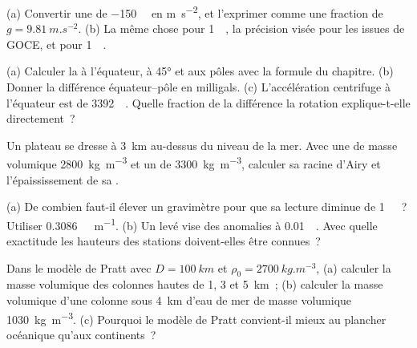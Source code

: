 \begin{exercise}[$\star$]\label{exo:b1:isostasy-gravity:1}
(a) Convertir une  de \qty{-150}{\milli\gal} en \unit{m.s^{-2}},
et l'exprimer comme une fraction de $g = \qty{9.81}{m.s^{-2}}$. (b) La même chose pour
\qty{1}{\milli\gal}, la précision visée pour les  issues de
GOCE, et pour \qty{1}{\micro\gal}.
\end{exercise}

\begin{exercise}[$\star$]\label{exo:b1:isostasy-gravity:2}
(a) Calculer la  à l'équateur, à \ang{45} et aux pôles avec
la formule du chapitre. (b) Donner la différence équateur--pôle en
milligals. (c) L'accélération centrifuge à l'équateur est de
\qty{3392}{\milli\gal}. Quelle fraction de la différence la rotation
explique-t-elle directement~?
\end{exercise}

\begin{exercise}[$\star$]\label{exo:b1:isostasy-gravity:3}
Un plateau se dresse à \qty{3}{km} au-dessus du niveau de la mer. Avec une  de masse
volumique \qty{2800}{kg.m^{-3}} et un  de \qty{3300}{kg.m^{-3}}, calculer sa racine
d'Airy et l'épaississement de sa .
\end{exercise}

\begin{exercise}[$\star$]\label{exo:b1:isostasy-gravity:4}
(a) De combien faut-il élever un gravimètre pour que sa lecture diminue de
\qty{1}{\milli\gal}~? Utiliser \qty{0.3086}{\milli\gal.m^{-1}}. (b) Un levé vise des
anomalies à \qty{0.01}{\milli\gal}. Avec quelle exactitude les hauteurs des stations
doivent-elles être connues~?
\end{exercise}

\begin{exercise}[$\star\star$]\label{exo:b1:isostasy-gravity:5}
Dans le modèle de Pratt avec $D = \qty{100}{km}$ et $\rho_0 = \qty{2700}{kg.m^{-3}}$,
(a) calculer la masse volumique des colonnes hautes de 1, 3 et \qty{5}{km}~;
(b) calculer la masse volumique d'une colonne sous \qty{4}{km} d'eau de mer de masse volumique
\qty{1030}{kg.m^{-3}}. (c) Pourquoi le modèle de Pratt convient-il mieux au plancher
océanique qu'aux continents~?
\end{exercise}

